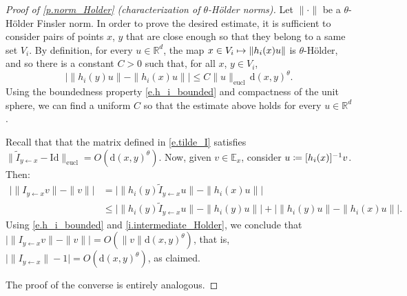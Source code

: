 \documentclass[JEP,XML,SOM,Unicode]{cedram}
\def\vcentcolon{\mathrel{\mathop\ordinarycolon}}
\providecommand\ordinarycolon{:}
\providecommand*\coloneqq{\vcentcolon\mathrel{\mkern-1.2mu}=}
\newcommand\mto{\mathchoice{\longmapsto}{\mapsto}{\mapsto}{\mapsto}}
\theoremstyle{plain}
\theoremstyle{definition}
\newcommand{\RR}{\mathbb{R}}
\newcommand{\EE}{\mathbb{E}}
\newcommand{\dd}{\mathrm{d}}
\begin{document}
\begin{proof}[Proof of \cref{p.norm_Holder} (characterization of $\theta$-Hölder norms)]
Let $\|\mathord{\cdot}\|$ be a $\theta$-Hölder Finsler norm.
In order to prove the desired estimate, it is sufficient to consider pairs of points $x$, $y$ that are close enough so that they belong to a same set $V_i$.
By definition, for every $u \in \RR^d$, the map $x \in V_i \mto \|h_i(x) u \|$ is $\theta$-Hölder, and so there is a constant $C > 0$ such that, for all $x$, $y \in V_i$,
\begin{equation}\label{i.intermediate_Holder}
\big| \| h_i(y) u \| - \| h_i(x) u \| \big| \le C \|u\|_\mathrm{eucl} \, \dd(x,y)^\theta.
\end{equation}
Using the boundedness property \eqref{e.h_i_bounded} and compactness of the unit sphere, we can find a uniform $C$ so that the estimate above holds for every $u \in \RR^d$.

Recall that that the matrix defined in \eqref{e.tilde_I} satisfies $\| \tilde I_{y \gets x} -\mathrm{Id}\|_\mathrm{eucl} = O(\dd(x,y)^\theta)$.
Now, given $v \in \EE_x$, consider $u \coloneqq [h_i(x)]^{-1} v$.
Then:
\begin{align*}
\big| \| I_{y \gets x} v\| - \| v \| \big|
&=
\big| \| h_i(y) \tilde I_{y \gets x} u \| - \| h_i(x) u \| \big| \\
&\le
\big| \| h_i(y) \tilde I_{y \gets x} u \| - \| h_i(y) u \| \big| +
\big| \| h_i(y) u\| - \| h_i(x) u \| \big|.
\end{align*}
Using \eqref{e.h_i_bounded} and \eqref{i.intermediate_Holder}, we conclude that $\big| \| I_{y \gets x} v\| - \| v \| \big| = O(\|v\| \dd(x,y)^\theta)$, that is, $\big| \| I_{y \gets x} \| - 1 \big| = O(\dd(x,y)^\theta)$, as claimed.

The proof of the converse is entirely analogous.
\end{proof}
\end{document}
